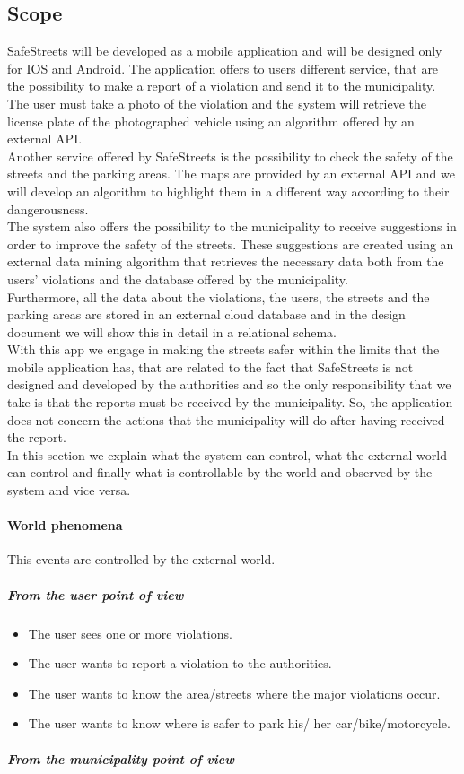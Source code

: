\documentclass[titlepage]{article}
\begin{document}
\subsection{Scope}
SafeStreets will be developed as a mobile application and will be designed only for IOS and Android.
The application offers to users different service, that are the possibility to make a report of a violation and send it to the municipality. The user must take a photo of the violation and the system will retrieve the license plate of the photographed vehicle using an algorithm offered by an external API. \\
Another service offered by SafeStreets is the possibility to check the safety of the streets and the parking areas. The maps are provided by an external API and we will develop an algorithm to highlight them in a different way according to their dangerousness. \\
The system also offers the possibility to the municipality to receive suggestions in order to improve the safety of the streets. These suggestions are created using an external data mining algorithm that retrieves the necessary data both from the users' violations and the database offered by the municipality. \\
Furthermore, all the data about the violations, the users, the streets and the parking areas are stored in an external cloud database and in the design document we will show this in detail in a relational schema. \\



With this app we engage in making the streets safer within the limits that the mobile application has, that are related to the fact that SafeStreets is not designed and developed by the authorities and so the only responsibility that we take is that the reports must be received by the municipality. So, the application does not concern the actions that the municipality will do after having received the report. \\

In this section we explain what the system can control, what the external world can control and finally what is controllable by the world and observed by the system and vice versa.

\paragraph{World phenomena\\}
This events are controlled by the external world.
\subparagraph{From the user point of view}
\begin{itemize}	
	\item The user sees one or more violations.
	\item The user wants to report a violation to the 					  authorities.
	\item The user wants to know the area/streets where the 
	     major violations occur.
	\item The user wants to know where is safer to park his/			  her car/bike/motorcycle.

\end{itemize}
\subparagraph{From the municipality point of view }
\end{document}
